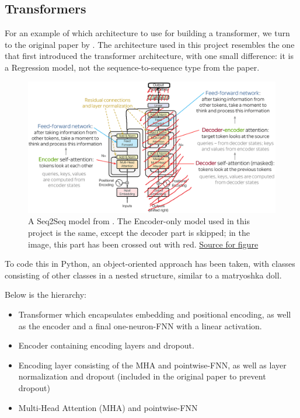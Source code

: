 \documentclass{article}
\begin{document}
\newpage
\subsection{Transformers}

For an example of which architecture to use for building a transformer, we turn to the original paper by \cite{vaswani2023attentionneed}. The architecture used in this project resembles the one that first introduced the transformer architecture, with one small difference: it is a Regression model, not the sequence-to-sequence type from the paper.

\begin{figure}[htbp]
    \centering
    \includegraphics[width=0.5\paperwidth]{images/transformerSeq2Seq.png}
    \caption{A Seq2Seq model from \cite{vaswani2023attentionneed}. The 
    Encoder-only model used in this project is the same, except the decoder 
    part is skipped; in the image, this part has been crossed out with red. \href{https://www.cloud.studio/ai-llm-how-do-llms-work}{Source for figure}}
    \label{fig:transformerSeq2Seq}
\end{figure}

To code this in Python, an object-oriented approach has been taken, with classes consisting of other classes in a nested structure, similar to a matryoshka doll.

Below is the hierarchy:

\begin{itemize}
    \item Transformer which encapsulates embedding and positional encoding, as well as the encoder and a final one-neuron-FNN with a linear activation.
    \item Encoder containing encoding layers and dropout.
    \item Encoding layer consisting of the MHA and pointwise-FNN, as well as layer normalization and dropout (included in the original paper to prevent dropout)
    \item Multi-Head Attention (MHA) and pointwise-FNN
\end{itemize}
\end{document}
